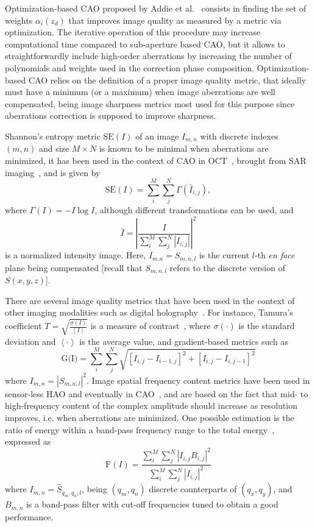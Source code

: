 Optimization-based CAO proposed by Addie et al.~\cite{Adie2012_Computational} consists in finding the set of weights $\alpha_i(z_d)$ that improves image quality as measured by a metric via optimization. The iterative operation of this procedure may increase computational time compared to sub-aperture based CAO, but it allows to straightforwardly include high-order aberrations by increasing the number of polynomials and weights used in the correction phase composition. Optimization-based CAO relies on the definition of a proper image quality metric, that ideally must have a minimum (or a maximum) when image aberrations are well compensated, being image sharpness metrics most used for this purpose since aberrations correction is supposed to improve sharpness.

Shannon's entropy metric $\text{SE}(I)$ of an image $I_{m,n}$ with discrete indexes $(m,n)$ and size $M\times N$ is known to be minimal when aberrations are minimized, it has been used in the context of CAO in OCT~\cite{Hillmann2016_Aberrationfree}, brought from SAR imaging~\cite{Flores1992_Robust}, and is given by
\begin{equation}\label{eq:SE}
	\text{SE}(I) = \sum_i^M\sum_j^N \Gamma(\bar{I}_{i,j}),
\end{equation}
where $\Gamma(I) = -I\log I$, although different transformations can be used, and
\begin{equation}
	\bar{I} = \left|\frac{I}{\sum_i^M\sum_j^N \left|I_{i,j}\right|}\right|^2
\end{equation}
is a normalized intensity image. Here, $I_{m.n}=S_{m,n,l}$ is the current $l$-th \textit{en face} plane being compensated [recall that $S_{m,n,l}$ refers to the discrete version of $S(x,y,z)$].

There are several image quality metrics that have been used in the context of other imaging modalities such as digital holography~\cite{Trujillo2015_Comparative}. For instance, Tamura's coefficient $T = \sqrt{\frac{\sigma(I)}{\left<I\right>}}$ is a measure of contrast~\cite{Memmolo2011_Automatic}, where $\sigma(\cdot)$ is the standard deviation and $\left<\cdot\right>$ is the average value, and gradient-based metrics such as
\begin{equation}
	\text{G(I)} = \sum_i^M\sum_j^N \sqrt{\left[I_{i,j}-I_{i-1,j}\right] ^2 + \left[I_{i,j}-I_{i,j-1}\right] ^2}
\end{equation}
where $I_{m,n} = |S_{m,n,l}| ^ 2$. Image spatial frequency content metrics have been used in sensor-less HAO and eventually in CAO~\cite{Debarre2007_Image}, and are based on the fact that mid- to high-frequency content of the complex amplitude should increase as resolution improves, i.e. when aberrations are minimized. One possible estimation is the ratio of energy within a band-pass frequency range to the total energy~\cite{Adie2012_Computational}, expressed as
\begin{equation}
	\text{F}(I) = \frac{\sum_i^M\sum_j^N |I_{i,j}B_{i,j}|^2 }{\sum_i^M\sum_j^N |I_{i,j}|^2}
\end{equation}
where $I_{m,n} = \hat{S}_{q_m, q_n,l}$, being $(q_m, q_n)$ discrete counterparts of $(q_x, q_y)$, and $B_{m,n}$ is a band-pass filter with cut-off frequencies tuned to obtain a good performance.

